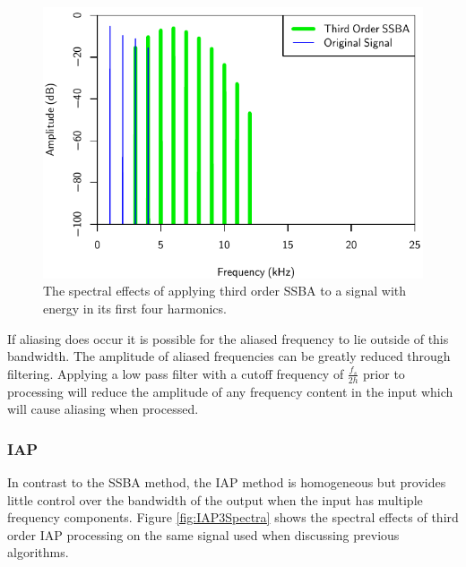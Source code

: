 			\begin{figure}[h!]
				\centering
				\includegraphics{chapter5/Images/SSBA3Spectra.pdf}
				\caption{The spectral effects of applying third order SSBA to a signal with energy in its 
				         first four harmonics.}
				\label{fig:SSBA3Spectra}
			\end{figure}

			If aliasing does occur it is possible for the aliased frequency to lie outside of this bandwidth.
			The amplitude of aliased frequencies can be greatly reduced through filtering. Applying a low pass
			filter with a cutoff frequency of $\frac{f_{s}}{2h}$ prior to processing will reduce the amplitude
			of any frequency content in the input which will cause aliasing when processed.

		\subsubsection*{IAP}
			In contrast to the SSBA method, the IAP method is homogeneous but provides little control over the
			bandwidth of the output when the input has multiple frequency components. Figure
			\ref{fig:IAP3Spectra} shows the spectral effects of third order IAP processing on the same signal
			used when discussing previous algorithms.

